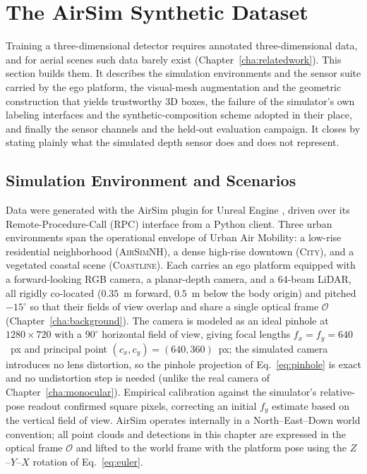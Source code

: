 \section{The AirSim Synthetic Dataset}
\label{sec:dataset}

Training a three-dimensional detector requires annotated three-dimensional data,
and for aerial scenes such data barely exist (Chapter~\ref{cha:relatedwork}). This
section builds them. It describes the simulation environments and the sensor suite
carried by the ego platform, the visual-mesh augmentation and the geometric
construction that yields trustworthy 3D boxes, the failure of the simulator's own
labeling interfaces and the synthetic-composition scheme adopted in their place,
and finally the sensor channels and the held-out evaluation campaign. It closes by
stating plainly what the simulated depth sensor does and does not represent.

\subsection{Simulation Environment and Scenarios}

Data were generated with the AirSim plugin for Unreal Engine
\cite{shah2018airsim}, driven over its Remote-Procedure-Call (RPC) interface from
a Python client. Three urban environments span the operational envelope of Urban
Air Mobility: a low-rise residential neighborhood (\textsc{AirSimNH}), a dense
high-rise downtown (\textsc{City}), and a vegetated coastal scene
(\textsc{Coastline}). Each carries an ego platform equipped with a
forward-looking RGB camera, a planar-depth camera, and a $64$-beam LiDAR, all
rigidly co-located ($0.35$~m forward, $0.5$~m below the body origin) and pitched
$-15^\circ$ so that their fields of view overlap and share a single optical frame
$\mathcal{O}$ (Chapter~\ref{cha:background}). The camera is modeled as an ideal
pinhole at $1280\times720$ with a $90^\circ$ horizontal field of view, giving
focal lengths $f_x=f_y=640$~px and principal point $(c_x,c_y)=(640,360)$~px;
the simulated camera introduces no lens distortion, so the pinhole projection of
Eq.~\eqref{eq:pinhole} is exact and no undistortion step is needed (unlike the
real camera of Chapter~\ref{cha:monocular}). Empirical calibration against the
simulator's relative-pose readout confirmed square pixels, correcting an initial
$f_y$ estimate based on the vertical field of view. AirSim operates internally in a North--East--Down world convention; all point
clouds and detections in this chapter are expressed in the optical frame
$\mathcal{O}$ and lifted to the world frame with the platform pose using the
$Z$--$Y$--$X$ rotation of Eq.~\eqref{eq:euler}.

